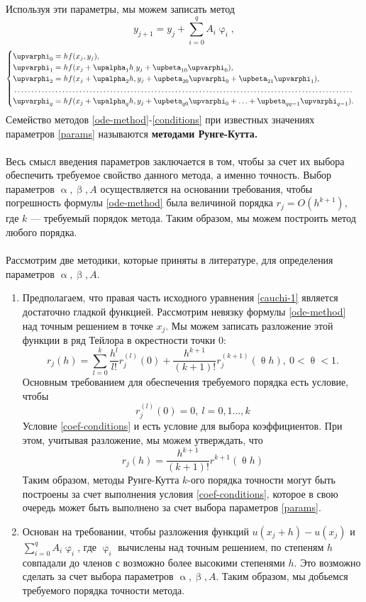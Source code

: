 \documentclass[a4paper, 12pt]{report}
\numberwithin{equation}{section}
\renewcommand{\alpha}{\upalpha}
\renewcommand{\beta}{\upbeta}
\renewcommand{\varphi}{\upvarphi}
\renewcommand{\theta}{\uptheta}
\begin{document}
	Используя эти параметры, мы можем записать метод 
	\begin{equation}
		\label{ode-method}
		y_{j+1} = y_j + \sum_{i=0}^q A_i\varphi_i,
	\end{equation}
	\begin{equation}
		\label{conditions}
		\begin{cases}
		\varphi_0 = hf(x_j, y_j),\\
		\varphi_1 = hf(x_j + \alpha_1 h_, y_j + \beta_{10}\varphi_0),\\
		\varphi_2 = hf(x_j + \alpha_2h, y_j + \beta_{20}\varphi_0 + \beta_{21}\varphi_1),\\
		\dotfill\\
		\varphi_q = hf(x_j + \alpha_q h, y_j + \beta_{q0} \varphi_0 + \ldots + \beta_{qq-1}\varphi_{q-1}).
	\end{cases}
	\end{equation}
	Семейство методов \eqref{ode-method}-\eqref{conditions} при известных значениях параметров \eqref{params} называются \textbf{методами Рунге-Кутта.}\\\\
	Весь смысл введения параметров заключается в том, чтобы за счет их выбора обеспечить требуемое свойство данного метода, а именно точность. Выбор параметров $\alpha, \beta, A$ осуществляется на основании требования, чтобы погрешность формулы \eqref{ode-method} была величиной порядка $r_j = O(h^{k+1})$, где $k$ --- требуемый порядок метода. Таким образом, мы можем построить метод любого порядка.
	\\\\
	Рассмотрим две методики, которые приняты в литературе, для определения параметров $\alpha, \beta, A$.
	\begin{enumerate}
		\item Предполагаем, что правая часть исходного уравнения \eqref{cauchi-1} является достаточно гладкой функцией. Рассмотрим невязку формулы \eqref{ode-method} над точным решением в точке $x_j$. Мы можем записать разложение этой функции в ряд Тейлора в окрестности точки $0$:
		$$r_j(h) = \sum_{l=0}^{k}\dfrac{h^l}{l!} r^{(l)}_j(0) + \dfrac{h^{k+1}}{(k+1)!}r_j^{(k+1)}(\theta h),\ 0 < \theta < 1.$$
		Основным требованием для обеспечения требуемого порядка есть условие, чтобы \begin{equation}
			\label{coef-conditions}
			r_j^{(l)}(0) = 0,\ l = 0,1\ldots, k
		\end{equation}
		Условие \eqref{coef-conditions} и есть условие для выбора коэффициентов. При этом, учитывая разложение, мы можем утверждать, что $$r_j(h)= \dfrac{h^{k+1}}{(k+1)!}r^{k+1}(\theta h)$$
		Таким образом, методы Рунге-Кутта $k$-ого порядка точности могут быть построены за счет выполнения условия \eqref{coef-conditions}, которое в свою очередь может быть выполнено за счет выбора параметров \eqref{params}.
		\item Основан на требовании, чтобы разложения функций $u(x_j + h) - u(x_j)$ и
		$\sum_{i=0}^{q}A_i \varphi_i$, где $\varphi_i$ вычислены над точным решением, по степеням $h$ совпадали до членов с возможно более высокими степенями $h$. Это возможно сделать за счет выбора параметров $\alpha, \beta, A$. Таким образом, мы добьемся требуемого порядка точности метода.
	\end{enumerate}
\end{document}
